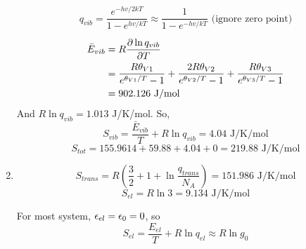 \begin{solution}
\begin{enumerate}
\begin{equation*}
              \end{equation*}
              \begin{tcolorbox}
                  \begin{equation*}
                      q_{vib}=\frac{e^{-hv/2kT}}{1-e^{hv/kT}}\approx\frac{1}{1-e^{-hv/kT}}\text{ (ignore zero point)}
                  \end{equation*}
              \end{tcolorbox}
              \begin{equation*}
                  \begin{aligned}
                      \bar{E}_{vib} & =R\frac{\partial \ln q_{vib}}{\partial T}                                                               \\
                                    & =\frac{R\theta_{V1}}{e^{\theta_{V1}/T}-1}+\frac{2R\theta_{V2}}{e^{\theta_{V2}/T}-1}
                      +\frac{R\theta_{V3}}{e^{\theta_{V3}/T}-1}                                                           \\
                                    & =902.126\text{ J/mol}
                  \end{aligned}
              \end{equation*}
              And $R\ln q_{vib}=1.013$ J/K/mol.
              So,
              \begin{equation*}
                  S_{vib}=\frac{\bar{E}_{vib}}{T}+R\ln q_{vib}=4.04\text{ J/K/mol}
              \end{equation*}
              \begin{equation*}
                  S_{tot}=155.9614+59.88+4.04+0=219.88\text{ J/K/mol}
              \end{equation*}
        \item \begin{equation*}
                  S_{trans}=R\left(\frac{3}{2}+1+\ln\frac{q_{trans}}{N_A}\right)=151.986\text{ J/K/mol}
              \end{equation*}
              \begin{equation*}
                  S_{el}=R\ln3=9.134\text{ J/K/mol}
              \end{equation*}
              \begin{tcolorbox}
                  For most system, $\epsilon_{el}=\epsilon_0=0$, so
                  \begin{equation*}
                      S_{el}=\frac{E_{el}}{T}+R\ln q_{el}\approx R\ln g_0
                  \end{equation*}

\end{tcolorbox}
\end{enumerate}
\end{solution}
